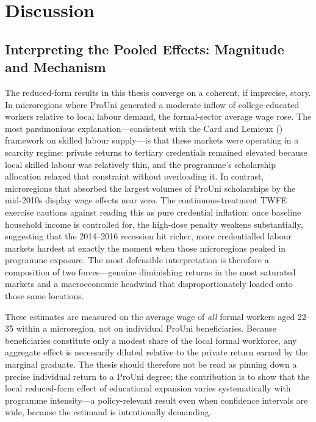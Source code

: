 \clearpage
\section{Discussion}
\label{sec:discussion}

\subsection{Interpreting the Pooled Effects: Magnitude and Mechanism}

The reduced-form results in this thesis converge on a coherent, if imprecise, story. In microregions where ProUni generated a moderate inflow of college-educated workers relative to local labour demand, the formal-sector average wage rose. The most parsimonious explanation---consistent with the Card and Lemieux (\citeyear{CardLemieux2001}) framework on skilled labour supply---is that these markets were operating in a scarcity regime: private returns to tertiary credentials remained elevated because local skilled labour was relatively thin, and the programme's scholarship allocation relaxed that constraint without overloading it. In contrast, microregions that absorbed the largest volumes of ProUni scholarships by the mid-2010s display wage effects near zero. The continuous-treatment TWFE exercise cautions against reading this as pure credential inflation: once baseline household income is controlled for, the high-dose penalty weakens substantially, suggesting that the 2014--2016 recession hit richer, more credentialled labour markets hardest at exactly the moment when those microregions peaked in programme exposure. The most defensible interpretation is therefore a composition of two forces---genuine diminishing returns in the most saturated markets and a macroeconomic headwind that disproportionately loaded onto those same locations.

These estimates are measured on the average wage of \emph{all} formal workers aged 22--35 within a microregion, not on individual ProUni beneficiaries. Because beneficiaries constitute only a modest share of the local formal workforce, any aggregate effect is necessarily diluted relative to the private return earned by the marginal graduate. The thesis should therefore not be read as pinning down a precise individual return to a ProUni degree; the contribution is to show that the local reduced-form effect of educational expansion varies systematically with programme intensity---a policy-relevant result even when confidence intervals are wide, because the estimand is intentionally demanding.

